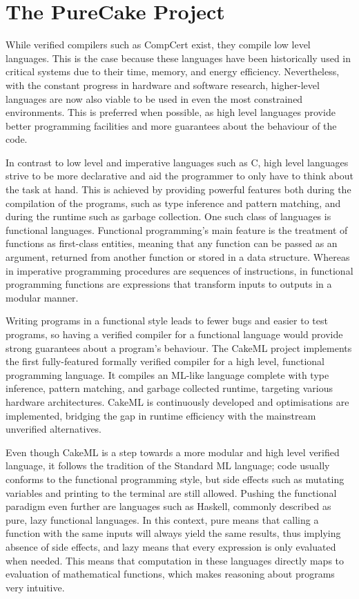 \section{The PureCake Project}

While verified compilers such as CompCert exist, they compile low level
languages. This is the case because these languages have been historically used
in critical systems due to their time, memory, and energy efficiency.
Nevertheless, with the constant progress in hardware and software research,
higher-level languages are now also viable to be used in even the most
constrained environments. This is preferred when possible, as high level
languages provide better programming facilities and more guarantees about the
behaviour of the code.

In contrast to low level and imperative languages such as C, high level
languages strive to be more declarative and aid the programmer to only have to
think about the task at hand. This is achieved by providing powerful features
both during the compilation of the programs, such as type inference and pattern
matching, and during the runtime such as garbage collection. One such class of
languages is functional languages. Functional programming's main feature is the
treatment of functions as first-class entities, meaning that any function can be
passed as an argument, returned from another function or stored in a data
structure. Whereas in imperative programming procedures are sequences of
instructions, in functional programming functions are expressions that transform
inputs to outputs in a modular manner.

Writing programs in a functional style leads to fewer bugs and easier to test
programs, so having a verified compiler for a functional language would provide
strong guarantees about a program's behaviour. The CakeML project \cite{CakeML}
implements the first fully-featured formally verified compiler for a high level,
functional programming language. It compiles an ML-like language complete with
type inference, pattern matching, and garbage collected runtime, targeting
various hardware architectures. CakeML is continuously developed and
optimisations are implemented, bridging the gap in runtime efficiency with the
mainstream unverified alternatives.

Even though CakeML is a step towards a more modular and high level verified
language, it follows the tradition of the Standard ML language; code usually
conforms to the functional programming style, but side effects such as mutating
variables and printing to the terminal are still allowed. Pushing the functional
paradigm even further are languages such as Haskell, commonly described as pure,
lazy functional languages. In this context, pure means that calling a function
with the same inputs will always yield the same results, thus implying absence
of side effects, and lazy means that every expression is only evaluated when
needed. This means that computation in these languages directly maps to
evaluation of mathematical functions, which makes reasoning about programs very
intuitive.

